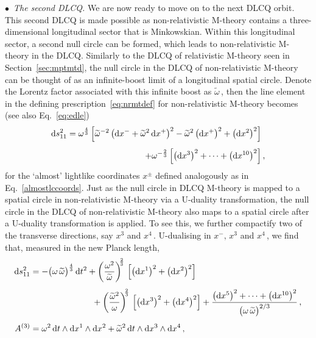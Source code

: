 \documentclass[11pt]{article}
\newcommand{\lr}{\left (}
\newcommand{\rr}{\right )}
\renewcommand{\tilde}[1]{\widetilde{#1}}
\renewcommand{\emph}[1]{\textit{#1}}
\newcommand{\dd}{\mathrm{d}}
\begin{document}
\noindent $\bullet$~\emph{The second DLCQ.} We are now ready to move on to the next DLCQ orbit. This second DLCQ is made possible as non-relativistic M-theory contains a three-dimensional longitudinal sector that is Minkowskian. Within this longitudinal sector, a second null circle can be formed, which leads to non-relativistic M-theory in the DLCQ. 
Similarly to the DLCQ of relativistic M-theory seen in Section~\ref{sec:mptmtd}, the null circle in the DLCQ of non-relativistic M-theory can be thought of as an infinite-boost limit of a longitudinal spatial circle. Denote the Lorentz factor associated with this infinite boost as $\tilde{\omega}$\,, then the line element in the defining prescription~\eqref{eq:nrmtdef} for non-relativistic M-theory becomes (see also Eq.~\eqref{eq:edle})
%
\begin{align} \label{eq:dlcqnrmtdef}
\begin{split}
	\dd s^2_{11} = \omega^{\frac{4}{3}} \, \Bigl[ \tilde{\omega}^{-2} \, \bigl( \dd x^- + \tilde{\omega}^2 \, \dd x^+ \bigr)^2 - \tilde{\omega}^2 \, \bigl( \dd x^+ \bigr)^2 + \bigl( \dd x^2 \bigr)^2 \Bigr] & \\[4pt]
    + \omega^{- \frac{2}{3}} \, \Bigl[ \bigl( \dd x^3 \bigr)^2 + \cdots + \bigl( \dd x^{10} \bigr)^2 \Bigr] & \,,
\end{split}
\end{align}
%
for the `almost' lightlike coordinates $x^\pm$ defined analogously as in Eq.~\eqref{almostlccoords}. Just as the null circle in DLCQ M-theory is mapped to a spatial circle in non-relativistic M-theory via a U-duality transformation, the null circle in the DLCQ of non-relativistic M-theory also maps to a spatial circle after a U-duality transformation is applied. 
To see this, we further compactify two of the transverse directions, say $x^3$ and $x^4$\,. U-dualising in $x^-, \, x^3$ and $x^4$\,, we find that, measured in the new Planck length, 
%
\begin{subequations} \label{eq:MMTdef}
\begin{align} 
	\dd s^2_{11} & = - \bigl( \omega \, \tilde{\omega} \bigr)^{\frac{4}{3}} \, \dd t^2 + \lr \frac{\omega^2}{\tilde{\omega}} \rr^{\!\!\frac{2}{3}} \, \Bigl[ \bigl( \dd x^1 \bigr)^2 + \bigl( \dd x^2 \bigr)^2 \Bigr] \notag \\[4pt]
        & \hspace{2.55cm} + \lr \frac{\tilde{\omega}^2}{\omega} \rr^{\!\!\frac{2}{3}} \, \Bigl[ \bigl( \dd x^3 \bigr)^2 + \bigl( \dd x^4 \bigr)^2 \Bigr]
    + \frac{\bigl( \dd x^5 \bigr)^2 + \cdots + \bigl( \dd x^{10} \bigr)^2}{\bigl( \omega \, \tilde{\omega} \bigr)^{2/3}}\,, \\[4pt] 
    A^{(3)} & = \omega^2 \, \dd t \wedge \dd x^1 \wedge \dd x^2 +\tilde{\omega}^2 \, \dd t \wedge \dd x^3 \wedge \dd x^4\,,
\end{align}
\end{subequations}
\end{document}
